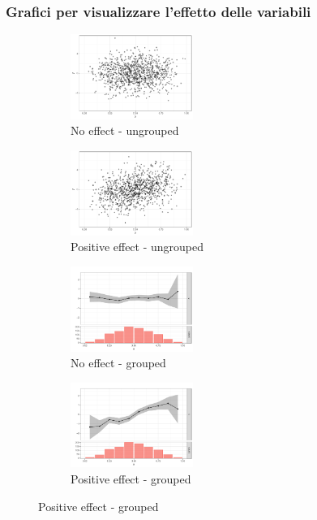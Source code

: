 \documentclass[pdf, aspectratio=169]{beamer}\usepackage[]{graphicx}\usepackage[]{color}
\theoremstyle{definition}
\begin{document}
\begin{frame}
\frametitle{Grafici per visualizzare l'effetto delle variabili}

\fontsize{9pt}{11pt}\selectfont

\begin{figure}
  \centering
  \begin{subfigure}[b]{4.8cm}
    \centering
    \includegraphics[width=4cm]{_bookdown_files/_main_files/figure-latex/var-selection-1.pdf}
    \caption{No effect - ungrouped}
  \end{subfigure}
  \qquad
  \begin{subfigure}[b]{4.8cm}
    \centering
    \includegraphics[width=4cm]{_bookdown_files/_main_files/figure-latex/var-selection-2.pdf}
    \caption{Positive effect - ungrouped}
  \end{subfigure}
  \par\medskip
  \begin{subfigure}[b]{4.8cm}
    \centering
    \includegraphics[width=4cm]{_bookdown_files/_main_files/figure-latex/var-selection-3.pdf}
    \caption{No effect - grouped}
  \end{subfigure}
  \qquad
  \begin{subfigure}[b]{4.8cm}
    \centering
    \includegraphics[width=4cm]{_bookdown_files/_main_files/figure-latex/var-selection-4.pdf}
    \caption{Positive effect - grouped}
  \end{subfigure}
\end{figure}

\end{frame}
\end{document}
